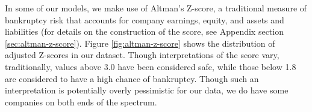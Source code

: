\documentclass{article}[11pt]
\begin{document}
    In some of our models, we make use of Altman's Z-score, a traditional measure of bankruptcy risk that accounts for company earnings, equity, and assets and liabilities \citep{altman_financial_1968} (for details on the construction of the score, see Appendix section \ref{sec:altman-z-score}). Figure \ref{fig:altman-z-score} shows the distribution of adjusted Z-scores in our dataset. Though interpretations of the score vary, traditionally, values above 3.0 have been considered safe, while those below 1.8 are considered to have a high chance of bankruptcy. Though such an interpretation is potentially overly pessimistic for our data, we do have some companies on both ends of the spectrum.

\end{document}
